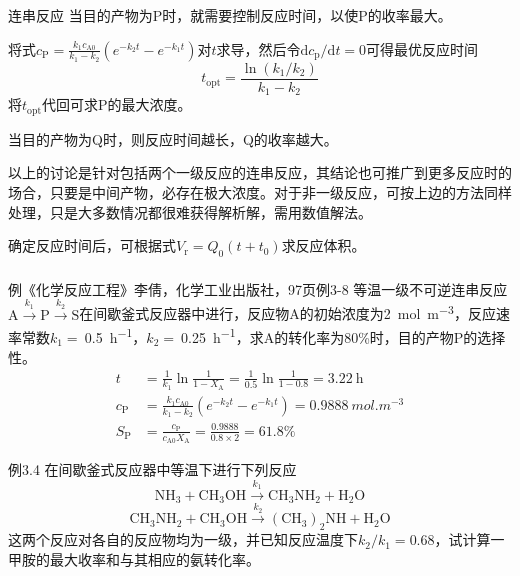 \documentclass[dvipsnames, svgnames, x11names]{beamer}
\begin{document}
\begin{frame}{连串反应}
    当目的产物为P时，就需要控制反应时间，以使P的收率最大。
    
    将式$c_{\mathrm{P}}=\frac{k_{1} c_{\mathrm{A} 0}}{k_{1}-k_{2}}(e^{-k_{2} t}-e^{-k_{1} t})$对$t$求导，然后令$\mathrm{d}c_\mathrm{p}/\mathrm{d}t=0$可得最优反应时间
    $$t_{\mathrm{opt}}=\frac{\ln (k_{1} / k_{2})}{k_{1}-k_{2}}$$
    将$t_{\mathrm{opt}}$代回可求P的最大浓度。

    当目的产物为Q时，则反应时间越长，Q的收率越大。

    以上的讨论是针对包括两个一级反应的连串反应，其结论也可推广到更多反应时的场合，只要是中间产物，必存在极大浓度。对于非一级反应，可按上边的方法同样处理，只是大多数情况都很难获得解析解，需用数值解法。
    
    确定反应时间后，可根据式$V_\mathrm{r}=Q_0(t+t_0)$求反应体积。
\end{frame}


\begin{frame}[t]
    \frametitle{}
    \begin{block}{例\quad \scriptsize{《化学反应工程》李倩，化学工业出版社，97页例3-8}}
        等温一级不可逆连串反应$\mathrm{A} \stackrel{k_{1}}{\longrightarrow} \mathrm{P} \stackrel{k_{2}}{\longrightarrow} \mathrm{S}$在间歇釜式反应器中进行，反应物A的初始浓度为\SI{2}{mol.m^{-3}}，反应速率常数$k_1=\ $\SI{0.5}{h^{-1}}，$k_2=\ $\SI{0.25}{h^{-1}}，求A的转化率为80\%时，目的产物P的选择性。
        \tcblower
        \pause
        \[
            \begin{aligned}
                 t&=\frac{1}{k_{1}} \ln \frac{1}{1-X_{\mathrm{A}}} = \frac{1}{0.5} \ln \frac{1}{1-0.8} = 3.22 \ \mathrm{h}\\
                 c_{\mathrm{P}}&=\frac{k_{1} c_{\mathrm{A} 0}}{k_{1}-k_{2}}\left(e^{-k_{2} t}-e^{-k_{1} t}\right) = 0.9888 \ \si{mol.m^{-3}}\\
                 S_{\mathrm{P}}&=\frac{c_{\mathrm{P}}}{c_{\mathrm{A0}}X_{\mathrm{A}}} = \frac{0.9888}{0.8\times 2} = 61.8\%
            \end{aligned}
        \]
    \end{block}
\end{frame}


\begin{frame}[t]{}
    \begin{block}{例3.4}
        在间歇釜式反应器中等温下进行下列反应
        $$\mathrm{NH}_{3}+\mathrm{CH}_{3} \mathrm{OH} \stackrel{k_{1}}{\longrightarrow} \mathrm{CH}_{3} \mathrm{NH}_{2}+\mathrm{H}_{2} \mathrm{O}$$
        $$\mathrm{CH}_{3} \mathrm{NH}_{2}+\mathrm{CH}_{3} \mathrm{OH} \stackrel{k_{2}}{\longrightarrow}\left(\mathrm{CH}_{3}\right)_{2} \mathrm{NH}+\mathrm{H}_{2} \mathrm{O}$$
        这两个反应对各自的反应物均为一级，并已知反应温度下$k_2/k_1=0.68$，试计算一甲胺的最大收率和与其相应的氨转化率。
    \end{block}
\end{frame}
\end{document}
